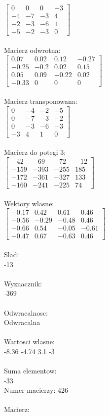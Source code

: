 \documentclass[a4paper,12pt]{article}
\begin{document}
$\begin{bmatrix} 0&0&0&-3\\-4&-7&-3&4\\-2&-3&-6&1\\-5&-2&-3&0 \end{bmatrix}$
\\
\\
Macierz odwrotna:\\

$\begin{bmatrix} 0.07&0.02&0.12&-0.27\\-0.25&-0.2&0.02&0.15\\0.05&0.09&-0.22&0.02\\-0.33&0&0&0 \end{bmatrix}$
\\
\\
Macierz transponowana:\\

$\begin{bmatrix} 0&-4&-2&-5\\0&-7&-3&-2\\0&-3&-6&-3\\-3&4&1&0 \end{bmatrix}$
\\
\\
Macierz do potegi 3:\\

$\begin{bmatrix} -42&-69&-72&-12\\-159&-393&-255&185\\-172&-361&-327&133\\-160&-241&-225&74 \end{bmatrix}$
\\
\\
Wektory wlasne:\\

$\begin{bmatrix} -0.17&0.42&0.61&0.46\\-0.56&-0.29&-0.48&0.46\\-0.66&0.54&-0.05&-0.61\\-0.47&0.67&-0.63&0.46 \end{bmatrix}$
\\
\\
Slad:\\
-13
\\
\\
Wyznacznik:\\
-369
\\
\\
Odwracalnosc:\\
Odwracalna
\\
\\
Wartosci wlasne:\\
-8.36 -4.74 3.1 -3
\\
\\
Suma elementow:\\
-33
\\
\newpage
Numer macierzy:
426
\\
\\
Macierz:\\
\end{document}
